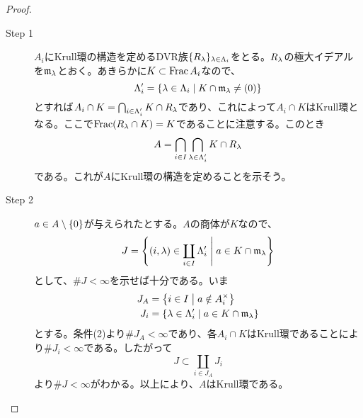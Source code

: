 \begin{proof} ${}$
  \begin{description}
    \item[Step 1] $A_i$にKrull環の構造を定めるDVR族$\{ R_{{\lambda}} \}_{{\lambda} \in {\Lambda}_i}$をとる。$R_{{\lambda}}$の極大イデアルを$\mathfrak{m}_{{\lambda}}$とおく。あきらかに$K \subset \operatorname{Frac} A_i$なので、
    \[
{\Lambda}'_i = \left\{ {\lambda} \in {\Lambda}_i \mathrel{} \middle| \mathrel{} K \cap \mathfrak{m}_{{\lambda}} \neq (0) \right\}
    \]
    とすれば$A_i \cap K = \bigcap_{i \in {\Lambda}'_i} K \cap R_{{\lambda}}$であり、これによって$A_i \cap K$はKrull環となる。ここで$\operatorname{Frac} (R_{{\lambda}} \cap K) = K$であることに注意する。このとき
    \[
    A = \bigcap_{i \in I} \bigcap_{{\lambda} \in {\Lambda}'_i} K \cap R_{{\lambda}}
    \]
    である。これが$A$にKrull環の構造を定めることを示そう。
    \item[Step 2] $a \in A \setminus \{0\}$が与えられたとする。$A$の商体が$K$なので、
    \[
    J = \left\{  (i,{\lambda}) \in \coprod_{i \in I} {\Lambda}'_i  \mathrel{} \middle| \mathrel{} a \in K \cap \mathfrak{m}_{{\lambda}} \right\}
    \]
    として、$\# J < \infty$を示せば十分である。いま
    \begin{align*}
      J_A &= \left\{ i \in I \mathrel{} \middle| \mathrel{} a  \notin A_i^{\times}  \right\} \\
      J_i &= \left\{  {\lambda} \in {\Lambda}'_i \mathrel{} \middle| \mathrel{} a \in K \cap \mathfrak{m}_{{\lambda}} \right\}
    \end{align*}
    とする。条件(2)より$\# J_A < \infty$であり、各$A_i \cap K$はKrull環であることにより$\# J_i < \infty$である。したがって
    \[
    J \subset \coprod_{i \in J_A} J_i
    \]
    より$\# J < \infty$がわかる。以上により、$A$はKrull環である。
  \end{description}
\end{proof}



